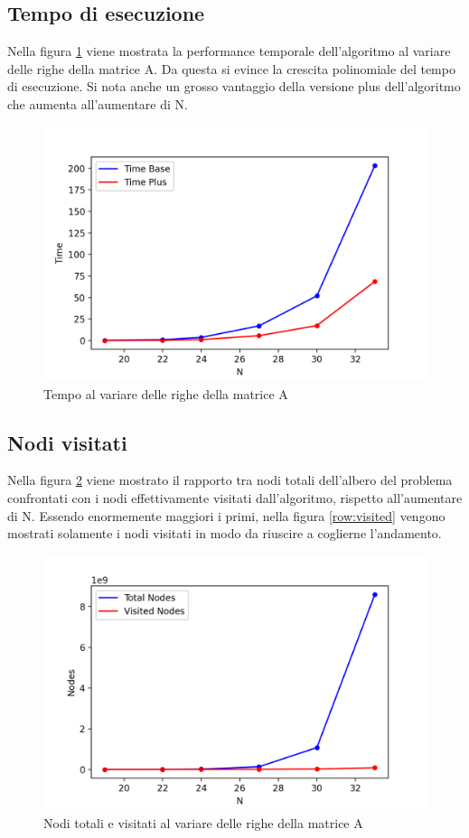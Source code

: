 \subsection{Tempo di esecuzione}
Nella figura \ref{n:time} viene mostrata la performance temporale dell'algoritmo al variare delle righe della matrice A. Da questa si evince la crescita polinomiale del tempo di esecuzione. Si nota anche un grosso vantaggio della versione plus dell'algoritmo che aumenta all'aumentare di N.



\begin{figure}[h!]
\centering
\includegraphics[width=0.8\linewidth]{figures/sudoku/s3_N_time.png}
\caption{Tempo al variare delle righe della matrice A}
\label{n:time}
\end{figure}

\subsection{Nodi visitati}
Nella figura \ref{row:nodes} viene mostrato il rapporto tra nodi totali dell'albero del problema confrontati con i nodi effettivamente visitati dall'algoritmo, rispetto all'aumentare di N. Essendo enormemente maggiori i primi, nella figura \ref{row:visited} vengono mostrati solamente i nodi visitati in modo da riuscire a coglierne l'andamento.


\begin{figure}[h!]
\centering
\includegraphics[width=0.8\linewidth]{figures/sudoku/s3_row_nodes.png}
\caption{Nodi totali e visitati al variare delle righe della matrice A}
\label{row:nodes}
\end{figure}


